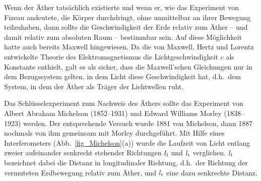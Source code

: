 Wenn der \"Ather tats\"achlich existierte und wenn er, wie das
Experiment von Fizeau andeutete, die K\"orper durchdringt, ohne
unmittelbar an ihrer Bewegung teilzuhaben, 
dann sollte die Geschwindigkeit der
Erde relativ zum \"Ather -- und damit relativ zum absoluten Raum --
bestimmbar sein. Auf diese M\"oglichkeit hatte auch bereits Maxwell 
hingewiesen. Da die von Maxwell, Hertz und Lorentz
entwickelte Theorie des Elektromagnetismus die Lichtgeschwindigkeit
$c$ als Konstante enthielt, galt es als sicher, dass die
Maxwell'schen Gleichungen nur in dem Bezugssystem gelten, in dem Licht
diese Geschwindigkeit hat, d.h.\ dem System, in dem der \"Ather als
Tr\"ager der Lichtwellen ruht.

Das Schl\"usselexperiment zum Nachweis des \"Athers sollte das
Experiment von Albert Abraham Michelson (1852--1931) und Edward Williams
Morley (1838--1923) werden. Der entsprechende Versuch wurde 1881
von Michelson, dann 1887 nochmals von ihm gemeinsam mit Morley 
durchgef\"uhrt. Mit Hilfe eines Interferometers (Abb.\ \ref{fig_Michelson}(a))
wurde die
Laufzeit von Licht entlang zweier aufeinander senkrecht stehender
Richtungen $l_{\rm l}$ und $l_{\rm t}$ verglichen. $l_{\rm l}$ bezeichnet
dabei die Distanz in longitudinaler Richtung, d.h.\ der Richtung der
vermuteten Erdbewegung relativ zum \"Ather, und $l_{\rm t}$ eine dazu
senkrechte Distanz. 

